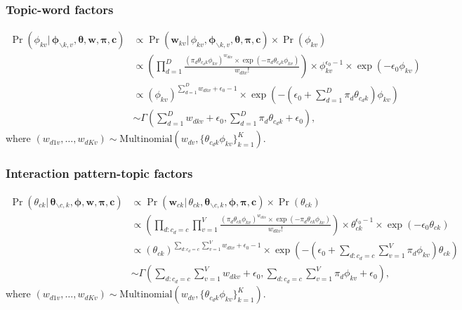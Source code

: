 \documentclass[ba]{imsart}
\numberwithin{equation}{section}
\theoremstyle{plain}
\begin{document}
				\subsubsection{Topic-word factors}
				\begin{equation}
				\begin{aligned}
				\Pr(\phi_{kv}|\,\boldsymbol{\phi}_{\backslash k,v},\boldsymbol{\theta},\boldsymbol{w},\boldsymbol{\pi},\boldsymbol{c}) & \propto \Pr(\boldsymbol{w}_{kv}|\,\phi_{kv},\boldsymbol{\phi}_{\backslash k,v},\boldsymbol{\theta},\boldsymbol{\pi},\boldsymbol{c}) \times \Pr(\phi_{kv})\\
				& \propto (\prod_{d=1}^D \frac{(\pi_{d} \theta_{c_dk}\phi_{kv})^{w_{dkv}}\times \exp(-\pi_{d} \theta_{c_dk}\phi_{kv})}{w_{dkv}!} )\times \phi_{kv}^{\epsilon_0-1} \times \exp(-\epsilon_0 \phi_{kv})\\
				&\propto (\phi_{kv})^{\sum_{d=1}^D w_{dkv}+\epsilon_0-1}\times \exp(-(\epsilon_0 +\sum_{d=1}^D\pi_{d} \theta_{c_dk})\phi_{kv})\\
				&	\sim \Gamma(\sum_{d=1}^D w_{dkv}+\epsilon_0, \sum_{d=1}^D\pi_{d} \theta_{c_dk}+\epsilon_0),
				\end{aligned}	
				\end{equation}
				where $(w_{d1v},\ldots,w_{dKv}) \sim \mbox{Multinomial}(w_{dv}, \{ \theta_{c_dk}\phi_{kv}\}_{k=1}^K)$.
	\subsubsection{Interaction pattern-topic factors}
				\begin{equation}
				\begin{aligned}
				\Pr(\theta_{ck}|\,\boldsymbol{\theta}_{\backslash c,k},\boldsymbol{\phi},\boldsymbol{w},\boldsymbol{\pi},\boldsymbol{c}) & \propto \Pr(\boldsymbol{w}_{ck}|\,\theta_{ck},\boldsymbol{\theta}_{\backslash c,k},\boldsymbol{\phi},\boldsymbol{\pi},\boldsymbol{c}) \times \Pr(\theta_{ck})\\
				& \propto (\prod_{d:c_d=c}\prod_{v=1}^V \frac{(\pi_{d} \theta_{ck}\phi_{kv})^{w_{dkv}}\times \exp(-\pi_{d} \theta_{ck}\phi_{kv})}{w_{dkv}!} )\times \theta_{ck}^{\epsilon_0-1} \times \exp(-\epsilon_0 \theta_{ck})\\
				&\propto (\theta_{ck})^{\sum_{d:c_d=c}\sum_{v=1}^V w_{dkv}+\epsilon_0-1}\times \exp(-(\epsilon_0 +\sum_{d:c_d=c}\sum_{v=1}^V\pi_{d} \phi_{kv})\theta_{ck})\\
				&	\sim \Gamma(\sum_{d:c_d=c}\sum_{v=1}^V w_{dkv}+\epsilon_0, \sum_{d:c_d=c}\sum_{v=1}^V\pi_{d} \phi_{kv}+\epsilon_0),
				\end{aligned}	
				\end{equation}
				where $(w_{d1v},\ldots,w_{dKv}) \sim \mbox{Multinomial}(w_{dv}, \{ \theta_{c_dk}\phi_{kv}\}_{k=1}^K)$.					
\end{document}
